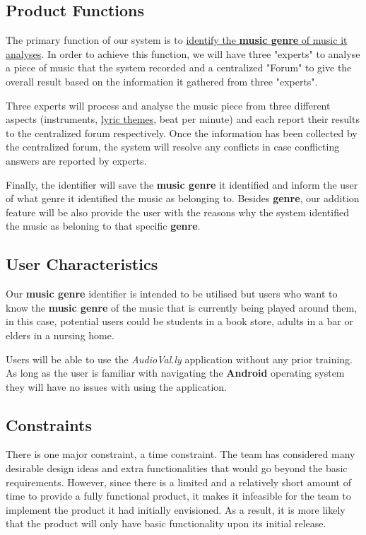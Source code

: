 \documentclass[]{article}
\begin{document}
\subsection{Product Functions}
\label{sub:product_functions}
The primary function of our system is to \underline{identify the \textbf{music genre} of music it analyses}. In order to achieve this function, we will have three "experts" to analyse a piece of music that the system recorded and a centralized "Forum" to give the overall result based on the information it gathered from three "experts".

Three experts will process and analyse the music piece from three different aspects (instruments, \underline{lyric themes}, beat per minute) and each report their results to the centralized forum respectively. Once the information has been collected by the centralized forum, the system will resolve any conflicts in case conflicting answers are reported by experts. 

Finally, the identifier will save the \textbf{music genre} it identified and inform the user of what genre it identified the music as belonging to. Besides \textbf{genre}, our addition feature will be also provide the user with the reasons why the system identified the music as beloning to that specific \textbf{genre}.


\subsection{User Characteristics}
\label{sub:user_characteristics}
Our \textbf{music genre} identifier is intended to be utilised but users who want to know the \textbf{music genre} of the music that is currently being played around them, in this case, potential users could be students in a book store, adults in a bar or elders in a nursing home.

Users will be able to use the \textit{AudioVal.ly} application without any prior training. As long as the user is familiar with navigating the \textbf{Android} operating system they will have no issues with using the application.

\subsection{Constraints}
\label{sub:constraints}
There is one major constraint, a time constraint. The team has considered many desirable design ideas and extra functionalities that would go beyond the basic requirements. However, since there is a limited and a relatively short amount of time to provide a fully functional product, it makes it infeasible for the team to implement the product it had initially envisioned. As a result, it is more likely that the product will only have basic functionality upon its initial release.
\end{document}

